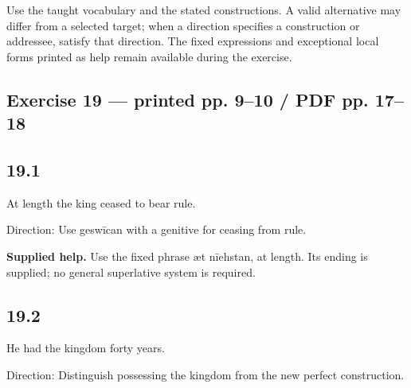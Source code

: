 Use the taught vocabulary and the stated constructions. A valid alternative may differ from a selected target; when a direction specifies a construction or addressee, satisfy that direction. The fixed expressions and exceptional local forms printed as help remain available during the exercise.

\subsection*{Exercise 19 — printed pp. 9–10 /\allowbreak{} PDF pp. 17–18}

\subsection*{19.1}

\par\begin{minipage}{\linewidth}\raggedright
At length the king ceased to bear rule.

Direction: Use geswīcan with a genitive for ceasing from rule.

\end{minipage}\par\addvspace{4pt}

\textbf{Supplied help.} Use the fixed phrase æt nīehstan, at length. Its ending is supplied; no general superlative system is required.

\subsection*{19.2}

\par\begin{minipage}{\linewidth}\raggedright
He had the kingdom forty years.

Direction: Distinguish possessing the kingdom from the new perfect construction.

\end{minipage}\par\addvspace{4pt}

